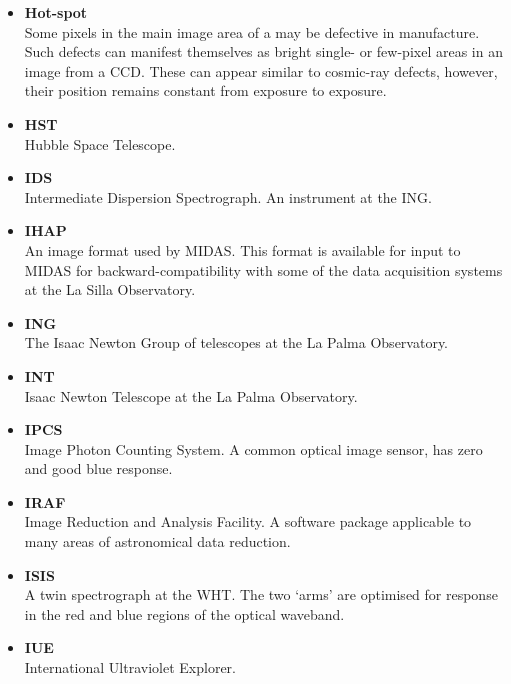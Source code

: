 {{\begin{itemize}
\item {\bf\label{gl_hotspot}Hot-spot}\\
      Some pixels in the main image area of a  may
      be defective in manufacture.  Such defects can manifest themselves
      as bright single- or few-pixel areas in an image from a CCD\@.
      These can appear similar to cosmic-ray defects, however, their
      position remains constant from exposure to exposure.

\item {\bf\label{gl_hst}HST}\\
      Hubble Space Telescope.

\item {\bf\label{gl_ids}IDS}\\
      Intermediate Dispersion Spectrograph.  An instrument at the
      ING\@.

\item {\bf\label{gl_ihap}IHAP}\\
      An image format used by MIDAS.  This format is available for
      input to MIDAS for backward-compatibility with some of the
      data acquisition systems at the La Silla Observatory.

\item {\bf\label{gl_ing}ING}\\
      The Isaac Newton Group of telescopes at the La Palma Observatory.

\item {\bf\label{gl_int}INT}\\
      Isaac Newton Telescope at the La Palma Observatory.

\item {\bf\label{gl_ipcs}IPCS}\\
      Image Photon Counting System.  A common optical image sensor,
      has zero  and good blue
      response.

\item {\bf\label{gl_iraf}IRAF}\\
      Image Reduction and Analysis Facility.  A software package
      applicable to many areas of astronomical data reduction.

\item {\bf\label{gl_isis}ISIS}\\
      A twin spectrograph at the WHT.  The two `arms' are optimised
      for response in the red and blue regions of the optical waveband.

\item {\bf\label{gl_iue}IUE}\\
      International Ultraviolet Explorer.


\end{itemize}}}
